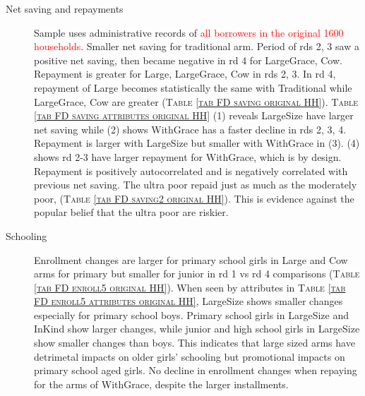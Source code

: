 \begin{description}
\vspace{1.0ex}\setlength{\itemsep}{1.0ex}\setlength{\baselineskip}{12pt}
\item[Net saving and repayments]	 Sample uses administrative records of \textcolor{red}{all borrowers in the original 1600 households}. Smaller net saving for \textsf{traditional} arm. Period of rds 2, 3 saw a positive net saving, then became negative in rd 4 for \textsf{LargeGrace, Cow}. Repayment is greater for \textsf{Large, LargeGrace, Cow} in rds 2, 3. In rd 4, repayment of \textsf{Large} becomes statistically the same with \textsf{Traditional} while \textsf{LargeGrace, Cow} are greater (\textsc{Table \ref{tab FD saving original HH}}). \textsc{\normalsize Table \ref{tab FD saving attributes original HH}} (1) reveals \textsf{LargeSize} have larger net saving while (2) shows \textsf{WithGrace} has a faster decline in rds 2, 3, 4. Repayment is larger with \textsf{LargeSize} but smaller with \textsf{WithGrace} in (3). (4) shows rd 2-3 have larger repayment for \textsf{WithGrace}, which is by design. Repayment is positively autocorrelated and is negatively correlated with previous net saving. The ultra poor repaid just as much as the moderately poor, (\textsc{Table \ref{tab FD saving2 original HH}}). This is evidence against the popular belief that the ultra poor are riskier.  
\item[Schooling]	Enrollment changes are larger for primary school girls in \textsf{Large} and \textsf{Cow} arms for primary but smaller for junior in rd 1 vs rd 4 comparisons (\textsc{Table \ref{tab FD enroll5 original HH}}). When seen by attributes in \textsc{\normalsize Table \ref{tab FD enroll5 attributes original HH}}, \textsf{LargeSize} shows smaller changes especially for primary school boys. Primary school girls in \textsf{LargeSize} and \textsf{InKind} show larger changes, while junior and high school girls in \textsf{LargeSize} show smaller changes than boys. This indicates that large sized arms have detrimetal impacts on older girls' schooling but promotional impacts on primary school aged girls. No decline in enrollment changes when repaying for the arms of \textsf{WithGrace}, despite the larger installments.

\end{description}
